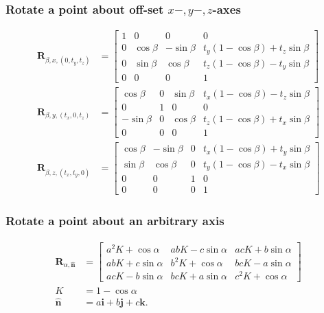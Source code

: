 \subsubsection*{Rotate a point about off-set $x-, y-, z$-axes}
$$
\begin{aligned}
\mathbf{R}_{\beta, x,\left(0, t_{y}, t_{z}\right)} & =\left[\begin{array}{cccc}
1 & 0 & 0 & 0 \\
0 & \cos \beta & -\sin \beta & t_{y}(1-\cos \beta)+t_{z} \sin \beta \\
0 & \sin \beta & \cos \beta & t_{z}(1-\cos \beta)-t_{y} \sin \beta \\
0 & 0 & 0 & 1
\end{array}\right] \\
\mathbf{R}_{\beta, y,\left(t_{x}, 0, t_{z}\right)} & =\left[\begin{array}{cccc}
\cos \beta & 0 & \sin \beta & t_{x}(1-\cos \beta)-t_{z} \sin \beta \\
0 & 1 & 0 & 0 \\
-\sin \beta & 0 & \cos \beta & t_{z}(1-\cos \beta)+t_{x} \sin \beta \\
0 & 0 & 0 & 1
\end{array}\right] \\
\mathbf{R}_{\beta, z,\left(t_{x}, t_{y}, 0\right)} & =\left[\begin{array}{cccc}
\cos \beta & -\sin \beta & 0 & t_{x}(1-\cos \beta)+t_{y} \sin \beta \\
\sin \beta & \cos \beta & 0 & t_{y}(1-\cos \beta)-t_{x} \sin \beta \\
0 & 0 & 1 & 0 \\
0 & 0 & 0 & 1
\end{array}\right]
\end{aligned}
$$

\subsubsection*{Rotate a point about an arbitrary axis}
$$
\begin{aligned}
\mathbf{R}_{\alpha, \hat{\mathbf{n}}} & =\left[\begin{array}{ccc}
a^{2} K+\cos \alpha & a b K-c \sin \alpha & a c K+b \sin \alpha \\
a b K+c \sin \alpha & b^{2} K+\cos \alpha & b c K-a \sin \alpha \\
a c K-b \sin \alpha & b c K+a \sin \alpha & c^{2} K+\cos \alpha
\end{array}\right] \\
K & =1-\cos \alpha \\
\hat{\mathbf{n}} & =a \mathbf{i}+b \mathbf{j}+c \mathbf{k} .
\end{aligned}
$$


